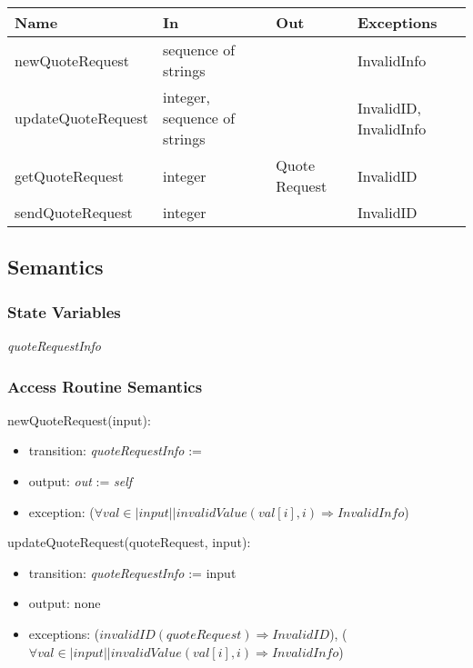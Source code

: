 \documentclass[12pt, titlepage]{article}
\begin{document}
\begin{center}
\begin{tabular}{p{5cm} p{4cm} p{4cm} p{2cm}}
\hline
\textbf{Name} & \textbf{In} & \textbf{Out} & \textbf{Exceptions} \\
\hline
newQuoteRequest & sequence of strings &  & InvalidInfo \\
updateQuoteRequest & integer, sequence of strings &  & InvalidID, InvalidInfo \\
getQuoteRequest & integer & Quote Request & InvalidID \\
sendQuoteRequest & integer & & InvalidID \\
\hline
\end{tabular}
\end{center}

\subsection{Semantics}

\subsubsection{State Variables}

\textit{quoteRequestInfo}

\subsubsection{Access Routine Semantics}

\noindent newQuoteRequest(input):
\begin{itemize}
\item transition: \textit{quoteRequestInfo} := 
\item output: \textit{out} := \textit{self}
\item exception: ($\forall val \in |input| | invalidValue(val[i], i) \Rightarrow InvalidInfo$)
\end{itemize}

\noindent updateQuoteRequest(quoteRequest, input):
\begin{itemize}
\item transition: \textit{quoteRequestInfo} := input
\item output: none
\item exceptions: ($invalidID(quoteRequest) \Rightarrow InvalidID$), ($\forall val \in |input| | invalidValue(val[i], i) \Rightarrow InvalidInfo$)
\end{itemize}
\end{document}

